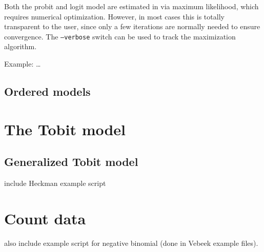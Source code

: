 Both the probit and logit model are estimated in  via
maximum likelihood, which requires numerical optimization. However, in
most cases this is totally transparent to the user, since only a few
iterations are normally needed to ensure convergence. The
\texttt{--verbose} switch can be used to track the maximization
algorithm.

Example: \ldots

\subsection{Ordered models}
\label{sec:ordered}

\section{The Tobit model}
\label{sec:tobit}

\subsection{Generalized Tobit model}
\label{sec:heckit}

include Heckman example script

\section{Count data}
\label{sec:poisson}

also include example script for negative binomial (done in Vebeek
example files).



